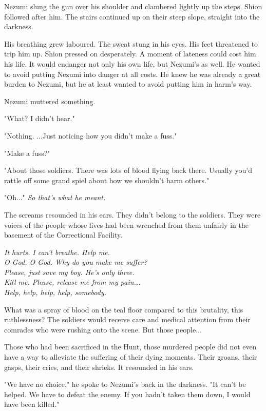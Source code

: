 Nezumi slung the gun over his shoulder and clambered lightly up the
steps. Shion followed after him. The stairs continued up on their steep
slope, straight into the darkness.

His breathing grew laboured. The sweat stung in his eyes. His feet
threatened to trip him up. Shion pressed on desperately. A moment of
lateness could cost him his life. It would endanger not only his own
life, but Nezumi's as well. He wanted to avoid putting Nezumi into
danger at all costs. He knew he was already a great burden to Nezumi,
but he at least wanted to avoid putting him in harm's way.

Nezumi muttered something.

"What? I didn't hear."

"Nothing. ...Just noticing how you didn't make a fuss."

"Make a fuss?"

"About those soldiers. There was lots of blood flying back there.
Usually you'd rattle off some grand spiel about how we shouldn't harm
others."

"Oh..." \emph{So that's what he meant.}

The screams resounded in his ears. They didn't belong to the soldiers.
They were voices of the people whose lives had been wrenched from them
unfairly in the basement of the Correctional Facility.

\myspace

\emph{It hurts. I can't breathe. Help me.\\
	O God, O God. Why do you make me suffer?\\
	Please, just save my boy. He's only three.\\
	Kill me. Please, release me from my pain...\\
	Help, help, help, help, somebody.}

\myspace

What was a spray of blood on the teal floor compared to this brutality,
this ruthlessness? The soldiers would receive care and medical attention
from their comrades who were rushing onto the scene. But those people...

Those who had been sacrificed in the Hunt, those murdered people did not
even have a way to alleviate the suffering of their dying moments. Their
groans, their gasps, their cries, and their shrieks. It resounded in his
ears.

"We have no choice," he spoke to Nezumi's back in the darkness. "It
can't be helped. We have to defeat the enemy. If you hadn't taken them
down, I would have been killed."


